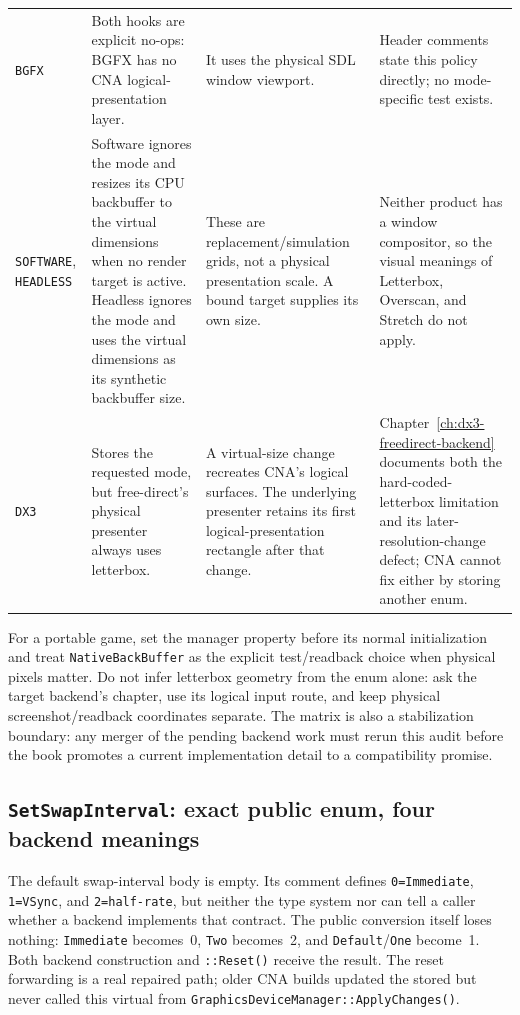 \begin{longtable}{@{}p{}p{}p{}p{}@{}}
\texttt{BGFX}
  & Both hooks are explicit no-ops: BGFX has no CNA logical-presentation layer.
  & It uses the physical SDL window viewport.
  & Header comments state this policy directly; no mode-specific test exists. \\
\texttt{SOFTWARE}, \texttt{HEADLESS}
  & Software ignores the mode and resizes its CPU backbuffer to the virtual dimensions when no
    render target is active. Headless ignores the mode and uses the virtual dimensions as its
    synthetic backbuffer size.
  & These are replacement/simulation grids, not a physical presentation scale. A bound target
    supplies its own size.
  & Neither product has a window compositor, so the visual meanings of Letterbox, Overscan, and
    Stretch do not apply. \\
\texttt{DX3}
  & Stores the requested mode, but free-direct's physical presenter always uses letterbox.
  & A virtual-size change recreates CNA's logical surfaces. The underlying presenter retains its
    first logical-presentation rectangle after that change.
  & Chapter~\ref{ch:dx3-freedirect-backend} documents both the hard-coded-letterbox limitation
    and its later-resolution-change defect; CNA cannot fix either by storing another enum. \\
\bottomrule
\end{longtable}
\endgroup

For a portable game, set the manager property before its normal initialization and treat
\texttt{NativeBackBuffer} as the explicit test/readback choice when physical pixels matter. Do
not infer letterbox geometry from the enum alone: ask the target backend's chapter, use its
logical input route, and keep physical screenshot/readback coordinates separate. The matrix is
also a stabilization boundary: any merger of the pending backend work must rerun this audit
before the book promotes a current implementation detail to a compatibility promise.

\subsection{\texttt{SetSwapInterval}: exact public enum, four backend meanings}
\label{sec:backend-swap-interval-matrix}

The default swap-interval body is empty. Its comment defines
\texttt{0=Immediate}, \texttt{1=VSync}, and \texttt{2=half-rate}, but neither the type system
nor  can tell a caller whether a backend implements that
contract. The public conversion itself loses nothing:
\texttt{Immediate} becomes~0, \texttt{Two} becomes~2, and
\texttt{Default}/\texttt{One} become~1. Both backend construction and
\texttt{::Reset()} receive the result. The reset forwarding is a
real repaired path; older CNA builds updated the stored
 but never called this virtual from
\texttt{GraphicsDevice\allowbreak Manager::ApplyChanges()}.

